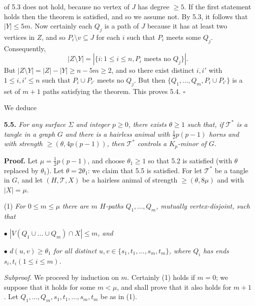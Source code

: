 \noindent of 5.3 does not hold, because no vertex of $J$ has degree $\ge 5$. If the first statement holds then the theorem is satisfied, and so we assume not. By 5.3, it follows that $|Y| \le 5m$. Now certainly each $Q_j$ is a path of $J$ because it has at least two vertices in $Z$, and so $P_i \setminus v \subseteq J$ for each $i$ such that $P_i$ meets some $Q_j$. Consequently,
\begin{equation*}
|Z \setminus Y| = |\{i : 1 \le i \le n, P_i \text{ meets no } Q_j\}|.
\end{equation*}
But $|Z \setminus Y| = |Z| - |Y| \ge n - 5m \ge 2$, and so there exist distinct $i, i'$ with $1 \le i, i' \le n$ such that $P_i \cup P_{i'}$ meets no $Q_j$. But then $\{Q_1, \dots, Q_m, P_i \cup P_{i'}\}$ is a set of $m + 1$ paths satisfying the theorem. This proves 5.4. $\square$

We deduce

\textbf{5.5.} \textit{For any surface $\Sigma$ and integer $p \ge 0$, there exists $\theta \ge 1$ such that, if $\mathscr{T}^*$ is a tangle in a graph $G$ and there is a hairless animal with $\frac{1}{2}p(p - 1)$ horns and with strength $\ge (\theta, 4p(p - 1))$, then $\mathscr{T}^*$ controls a $K_p$-minor of $G$.}

\textbf{Proof.} Let $\mu = \frac{1}{2}p(p - 1)$, and choose $\theta_1 \ge 1$ so that 5.2 is satisfied (with $\theta$ replaced by $\theta_1$). Let $\theta = 2\theta_1$: we claim that 5.5 is satisfied. For let $\mathscr{T}^*$ be a tangle in $G$, and let $(H, \mathscr{T}, X)$ be a hairless animal of strength $\ge (\theta, 8\mu)$ and with $|X| = \mu$.

\hspace*{12pt}(1) \textit{For $0 \le m \le \mu$ there are $m$ $H$-paths $Q_1, \dots, Q_m$, mutually vertex-disjoint, such that}

\hspace*{12pt}$\bullet$ \textit{$|V(Q_1 \cup \dots \cup Q_m) \cap X| \le m$, and}

\hspace*{12pt}$\bullet$ \textit{$d(u, v) \ge \theta_1$ for all distinct $u, v \in \{s_1, t_1, \dots, s_m, t_m\}$, where $Q_i$ has ends $s_i, t_i (1 \le i \le m)$.}

\textit{Subproof.} We proceed by induction on $m$. Certainly (1) holds if $m = 0$; we suppose that it holds for some $m < \mu$, and shall prove that it also holds for $m + 1$. Let $Q_1, \dots, Q_m, s_1, t_1, \dots, s_m, t_m$ be as in (1).

